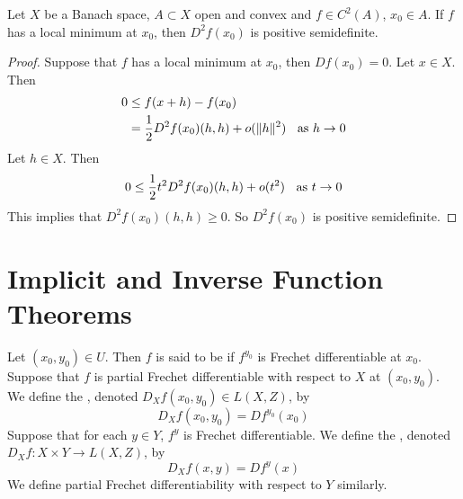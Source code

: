 \documentclass{book}
\begin{document}
	
	
	
	\begin{ex} \lex{}
	Let $X$ be a Banach space, $A \subset X$ open and convex and $f\in C^{2}(A)$, $x_0 \in A$. If $f$ has a local minimum at $x_0$, then $D^2f(x_0)$ is positive semidefinite.   
	\end{ex}
	
	\begin{proof}
	Suppose that $f$ has a local minimum at $x_0$, then $Df(x_0) = 0$. Let $x \in X$. Then 
	\begin{align*}
	0 
	& \leq f(x+h) - f(x_0) \\
	&= \frac{1}{2} D^2f(x_0)(h,h) +o(\|h\|^2) \hspace{.2cm} \text{ as } h \rightarrow 0
	\end{align*}
	Let $h \in X$. Then $$0 \leq \frac{1}{2} t^2 D^2f(x_0)(h,h) +o(t^2) \hspace{.2cm} \text{ as } t \rightarrow 0$$
	This implies that $D^2f(x_0)(h,h) \geq 0$. So $D^2f(x_0)$ is positive semidefinite.
	\end{proof}





























	\newpage
	\section{Implicit and Inverse Function Theorems}
	\begin{defn}
		Let $(x_0,y_0) \in U$. Then $f$ is said to be  if $f^{y_0}$ is Frechet differentiable at $x_0$. \\
		Suppose that $f$ is partial Frechet differentiable with respect to $X$ at $(x_0, y_0)$. We define the , denoted $D_X f(x_0, y_0) \in L(X, Z)$, by 
		$$D_Xf(x_0, y_0) = Df^{y_0}(x_0)$$
		Suppose that for each $y \in Y$, $f^{y}$ is Frechet differentiable. We define the , denoted $D_X f: X \times Y \rightarrow L(X, Z)$, by 
		$$D_Xf(x, y) = Df^{y}(x)$$
		We define partial Frechet differentiability with respect to $Y$ similarly.
	\end{defn}
\end{document}
